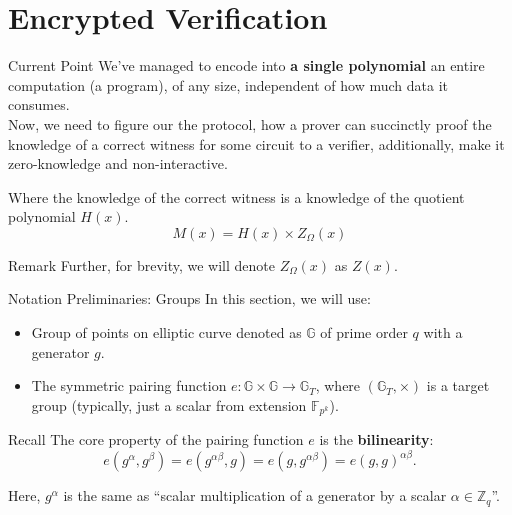 \documentclass{zkdl-presentation-template}
\begin{document}
    \section{Encrypted Verification}

    \begin{frame}{Current Point}
        We've managed to encode into \textbf{a single polynomial} an entire computation (a program),
        of any size, independent of how much data it consumes. \\ 
        \vspace{10pt}
        Now, we need to figure our the protocol, how a prover can succinctly proof the knowledge of
        a correct witness for some circuit to a verifier, additionally, make it zero-knowledge and 
        non-interactive.

        Where the knowledge of the correct witness is a knowledge of the quotient polynomial $H(x)$.
        \begin{equation*}
            M(x) = H(x) \times Z_{\Omega}(x)
        \end{equation*}

        \begin{block}{Remark}
            Further, for brevity, we will denote $Z_{\Omega}(x)$ as $Z(x)$.
        \end{block}
    \end{frame}

    \begin{frame}{Notation Preliminaries: Groups}
        In this section, we will use:
        \begin{itemize}[label=]
            \item Group of points on elliptic curve 
            denoted as $\mathbb{G}$ of prime order $q$ with a generator $g$.
            \item The symmetric pairing function $e: \mathbb{G} \times \mathbb{G} \to \mathbb{G}_T$, where
            $(\mathbb{G}_T, \times)$ is a target group (typically, just a scalar from extension $\mathbb{F}_{p^k}$).
        \end{itemize}
        \begin{alertblock}{Recall}
            The core property of the pairing function $e$ is the \textbf{bilinearity}:
            \begin{equation*}
                e(g^{\alpha}, g^{\beta}) = e(g^{\alpha\beta}, g) = e(g, g^{\alpha\beta}) = e(g,g)^{\alpha\beta}.
            \end{equation*}

            Here, $g^{\alpha}$ is the same as ``scalar multiplication of a generator by a scalar $\alpha \in \mathbb{Z}_q$''.
        \end{alertblock}
    \end{frame}
\end{document}
